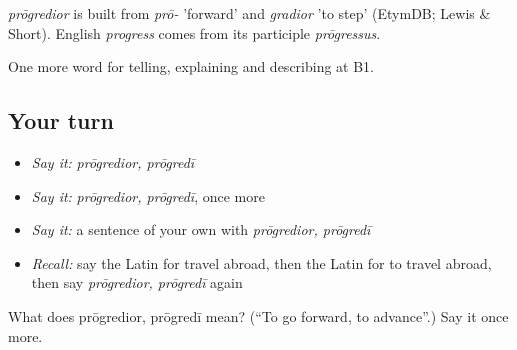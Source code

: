 \begin{cousinweb}
\emph{prōgredior} is built from \emph{prō-} 'forward' and \emph{gradior} 'to step' (EtymDB; Lewis \& Short). English \emph{progress} comes from its participle \emph{prōgressus}.
\end{cousinweb}

\begin{grammarlens}[title={What you've built}]
One more word for telling, explaining and describing at B1.
\end{grammarlens}

\subsection*{Your turn}
\begin{itemize}
\raggedright
  \item \emph{Say it:} \emph{prōgredior, prōgredī}
  \item \emph{Say it:} \emph{prōgredior, prōgredī}, once more
  \item \emph{Say it:} a sentence of your own with \emph{prōgredior, prōgredī}
  \item \emph{Recall:} say the Latin for travel abroad, then the Latin for to travel abroad, then say \emph{prōgredior, prōgredī} again
\end{itemize}

\begin{tcolorbox}[breakable,colback=teal!4,colframe=teal!35!black,title={Before you move on}]
What does prōgredior, prōgredī mean? (\textquotedblleft{}To go forward, to advance\textquotedblright{}.) Say it once more.
\end{tcolorbox}
